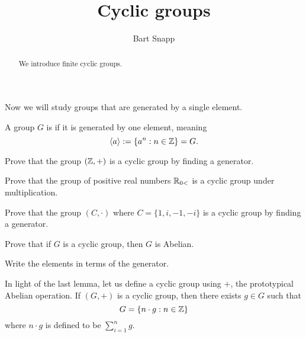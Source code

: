 \documentclass{ximera}
\author{Bart Snapp}
\title{Cyclic groups}
\begin{document}
\begin{abstract}
  We introduce finite cyclic groups.
\end{abstract}
\maketitle

Now we will study groups that are generated by a single element. 

\begin{definition}
  A group $G$ is  if it is generated by one element,
  meaning
  \[
  \langle a\rangle := \{a^n:n\in \mathbb Z\} = G.
  \]
\end{definition}


\begin{exercise}
  Prove that the group $(\mathbb Z,+)$ is a cyclic group by finding a
  generator.
\end{exercise}

\begin{exercise}
  Prove that the group of positive real numbers $\mathbb R_{0<}$ is a cyclic
  group under multiplication.
\end{exercise}


\begin{exercise}
  Prove that the group $(C,\cdot)$ where $C=\{1,i,-1,-i\}$ is a cyclic
  group by finding a generator.
\end{exercise}

\begin{lemma}
  Prove that if $G$ is a cyclic group, then $G$ is Abelian.
  \begin{sketch}
    Write the elements in terms of the generator.
  \end{sketch}
\end{lemma}

In light of the last lemma, let us define a cyclic group using $+$, the
prototypical Abelian operation. If $(G,+)$ is a cyclic group, then
there exists $g\in G$ such that
\[
G = \{n\cdot g: n\in \mathbb Z\}
\]
where $n\cdot g$ is defined to be $\sum_{i=1}^n g$.
\end{document}
